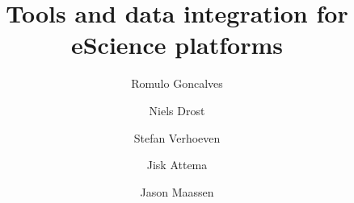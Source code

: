 \documentclass[conference]{IEEEtran}
\begin{document}

\title{\textbf{Tools and data integration for eScience platforms}}
\author[1]{Romulo Goncalves}
\author[1]{Niels Drost}
\author[1]{Stefan Verhoeven}
\author[1]{Jisk Attema}
\author[1]{Jason Maassen}



\date{} %
\maketitle\thispagestyle{empty} %

\begin{abstract}
\end{abstract}









{%


}
\end{document}
